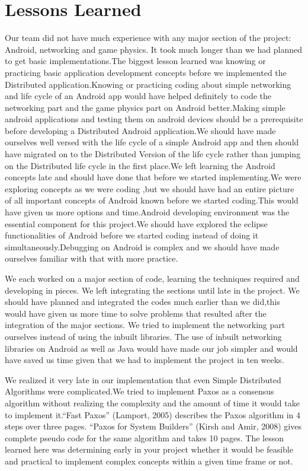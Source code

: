 \documentclass{sig-alternate}
\begin{document}
\section{Lessons Learned}
\label{lessons}

Our team did not have much experience with any major section of the
project: Android, networking and game physics.  It took much longer than we
had planned to get basic implementations.The biggest lesson learned was
knowing or practicing basic application development concepts before we
implemented the Distributed application.Knowing or practicing coding about
simple networking and life cycle of an Android app  would have helped
definitely to code the networking part and the game physics part on Android
better.Making simple android applications and testing them on android
devices should be a prerequisite before developing a Distributed Android
application.We should have made ourselves well versed with the life cycle
of a simple Android app and then should have migrated on to the Distributed
Version of the life cycle rather than jumping on the Distributed life cycle
in the first place.We left learning the Android concepts late and should
have done that before we started implementing.We were exploring concepts as
we were coding ,but we should have had an entire picture of all important
concepts of Android known before we started coding.This would have given us
more options and time.Android developing environment was the essential
component for this project.We should have explored the eclipse
functionalities of Android before we started coding instead of doing it
simultaneously.Debugging on Android is complex and we should have made
ourselves familiar with that with more practice.

We each worked on a major section of code, learning the techniques required
and developing in pieces.  We left integrating the sections until late in
the project.  We should have planned and integrated the codes much earlier
than we did,this would have given us more time to solve problems that
resulted after the integration of the major sections.  We tried to
implement the networking part ourselves instead of using the inbuilt
libraries.  The use of inbuilt networking libraries on Android as well as
Java would have made our job simpler and would have saved us time given
that we had to implement the project in ten weeks.

We realized it very late in our implementation that even Simple Distributed
Algorithms were complicated.We tried to implement Paxos as a consensus
algorithm without realizing the complexity and the amount of time it would
take to implement it.``Fast Paxos'' (Lamport, 2005) describes the Paxos
algorithm in 4 steps over three pages.  ``Paxos for System Builders''
(Kirsh and Amir, 2008) gives complete pseudo code for the same algorithm
and takes 10 pages.  The lesson learned here was determining early in your
project whether it would be feasible and practical  to implement  complex
concepts  within a given time frame or not.
\end{document}
